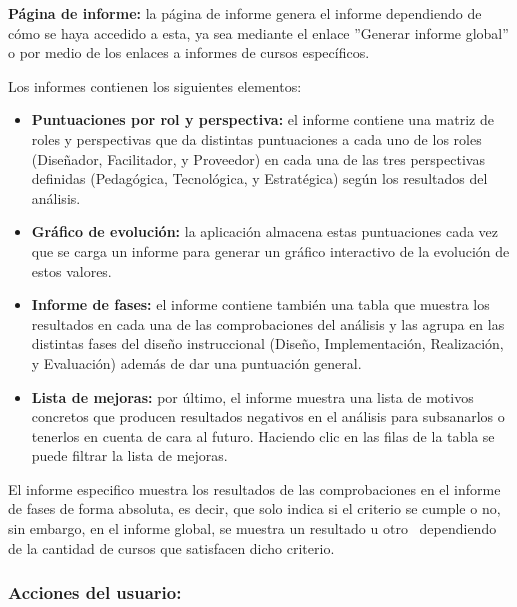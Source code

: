 \textbf{Página de informe:} la página de informe genera el informe
dependiendo de cómo se haya accedido a esta, ya sea mediante el enlace
''Generar informe global'' o por medio de los enlaces a informes de cursos
específicos.~

Los informes contienen los siguientes elementos:

\begin{itemize}
	\item
	\textbf{Puntuaciones por rol y perspectiva:} el informe contiene una
	matriz de roles y perspectivas que da distintas puntuaciones a cada
	uno de los roles (Diseñador, Facilitador, y Proveedor) en cada una de
	las tres perspectivas definidas (Pedagógica, Tecnológica, y
	Estratégica) según los resultados del análisis.
	\item
	\textbf{Gráfico de evolución:} la aplicación almacena estas puntuaciones cada vez que se carga un informe para generar un gráfico interactivo de la evolución de estos valores.
	\item
	\textbf{Informe de fases:} el informe contiene también una tabla que
	muestra los resultados en cada una de las comprobaciones del análisis y
	las agrupa en las distintas fases del diseño instruccional (Diseño,
	Implementación, Realización, y Evaluación) además de dar una
	puntuación general.
	\item
	\textbf{Lista de mejoras:} por último, el informe muestra una lista de
	motivos concretos que producen resultados negativos en el análisis
	para subsanarlos o tenerlos en cuenta de cara al futuro. Haciendo clic en las filas de la tabla se puede filtrar la lista de mejoras.
\end{itemize}

El informe especifico muestra los resultados de las comprobaciones en el
informe de fases de forma absoluta, es decir, que solo indica si el
criterio se cumple o no, sin embargo, en el informe global, se muestra
un resultado u otro ~dependiendo de la cantidad de cursos que satisfacen
dicho criterio.


\subsubsection{Acciones del usuario:}

